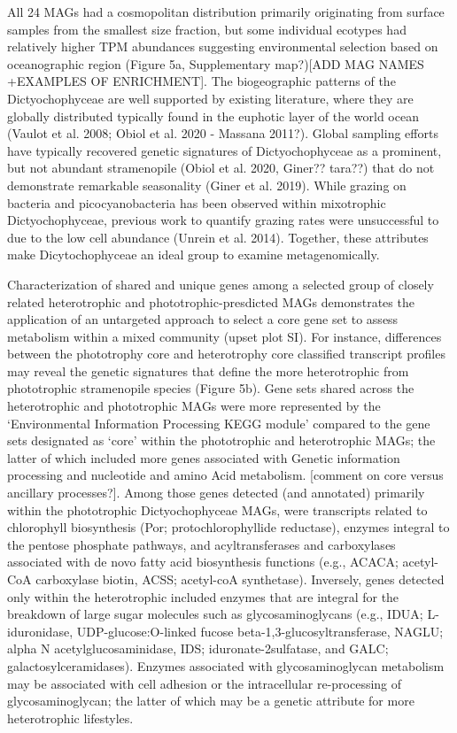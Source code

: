 \documentclass[12pt]{article}
\numberwithin{equation}{section}
\begin{document}
All 24 MAGs had a cosmopolitan distribution primarily originating from surface samples from the smallest size fraction, but some individual ecotypes had relatively higher TPM abundances suggesting environmental selection based on oceanographic region (Figure 5a, Supplementary map?)[ADD MAG NAMES +EXAMPLES OF ENRICHMENT]. The biogeographic patterns of the Dictyochophyceae are well supported by existing literature, where they are globally distributed typically found in the euphotic layer of the world ocean (Vaulot et al. 2008; Obiol et al. 2020 - Massana 2011?). Global sampling efforts have typically recovered genetic signatures of Dictyochophyceae as a prominent, but not abundant stramenopile (Obiol et al. 2020, Giner?? tara??) that do not demonstrate remarkable seasonality (Giner et al. 2019). While grazing on bacteria and picocyanobacteria has been observed within mixotrophic Dictyochophyceae, previous work to quantify grazing rates were unsuccessful to due to the low cell abundance (Unrein et al. 2014). Together, these attributes make Dicytochophyceae an ideal group to examine metagenomically. 

Characterization of shared and unique genes among a selected group of closely related heterotrophic and phototrophic-presdicted MAGs demonstrates the application of an untargeted approach to select a core gene set to assess metabolism within a mixed community (upset plot SI). For instance, differences between the phototrophy core and heterotrophy core classified transcript profiles may reveal the genetic signatures that define the more heterotrophic from phototrophic stramenopile species (Figure 5b). Gene sets shared across the heterotrophic and phototrophic MAGs were more represented by the ‘Environmental Information Processing KEGG module’ compared to the gene sets designated as ‘core’ within the phototrophic and heterotrophic MAGs; the latter of which included more genes associated with Genetic information processing and nucleotide and amino Acid metabolism. [comment on core versus ancillary processes?]. Among those genes detected (and annotated) primarily within the phototrophic Dictyochophyceae MAGs, were transcripts related to chlorophyll biosynthesis (Por; protochlorophyllide reductase), enzymes integral to the pentose phosphate pathways, and acyltransferases and carboxylases associated with de novo fatty acid biosynthesis functions (e.g., ACACA; acetyl-CoA carboxylase biotin, ACSS; acetyl-coA synthetase). Inversely, genes detected only within the heterotrophic included enzymes that are integral for the breakdown of large sugar molecules such as glycosaminoglycans (e.g., IDUA; L-iduronidase, UDP-glucose:O-linked fucose beta-1,3-glucosyltransferase, NAGLU; alpha N acetylglucosaminidase, IDS; iduronate-2sulfatase, and GALC; galactosylceramidases). Enzymes associated with glycosaminoglycan metabolism may be associated with cell adhesion or the intracellular re-processing of glycosaminoglycan; the latter of which may be a genetic attribute for more heterotrophic lifestyles. 
\end{document}
